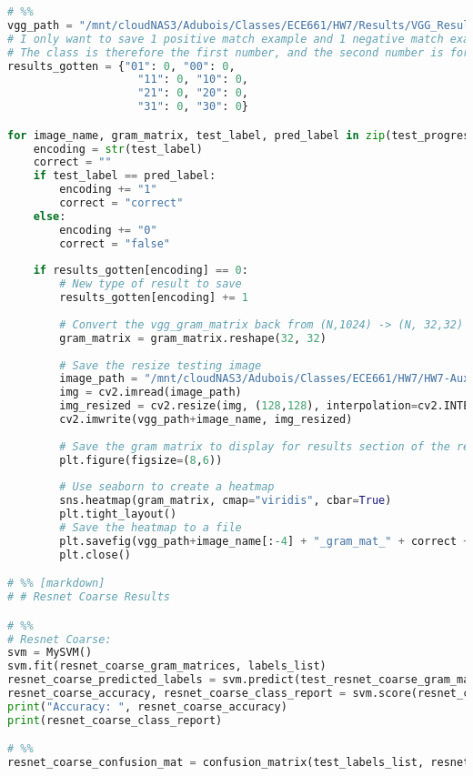 \documentclass{article}
\begin{document}
\begin{lstlisting}[language=Python]
# %%
vgg_path = "/mnt/cloudNAS3/Adubois/Classes/ECE661/HW7/Results/VGG_Results/"
# I only want to save 1 positive match example and 1 negative match example for each class
# The class is therefore the first number, and the second number is for matching labels or not
results_gotten = {"01": 0, "00": 0,
                    "11": 0, "10": 0,
                    "21": 0, "20": 0,
                    "31": 0, "30": 0}

for image_name, gram_matrix, test_label, pred_label in zip(test_progress_bar, test_vgg_gram_matrices, test_labels_list, vgg_predicted_labels):
    encoding = str(test_label)
    correct = ""
    if test_label == pred_label:
        encoding += "1"
        correct = "correct"
    else:
        encoding += "0"
        correct = "false"
    
    if results_gotten[encoding] == 0:
        # New type of result to save
        results_gotten[encoding] += 1
        
        # Convert the vgg_gram_matrix back from (N,1024) -> (N, 32,32) for display
        gram_matrix = gram_matrix.reshape(32, 32)
        
        # Save the resize testing image
        image_path = "/mnt/cloudNAS3/Adubois/Classes/ECE661/HW7/HW7-Auxilliary/data/testing/" + image_name
        img = cv2.imread(image_path)
        img_resized = cv2.resize(img, (128,128), interpolation=cv2.INTER_AREA)
        cv2.imwrite(vgg_path+image_name, img_resized)
        
        # Save the gram matrix to display for results section of the report
        plt.figure(figsize=(8,6))
        
        # Use seaborn to create a heatmap
        sns.heatmap(gram_matrix, cmap="viridis", cbar=True)
        plt.tight_layout()
        # Save the heatmap to a file
        plt.savefig(vgg_path+image_name[:-4] + "_gram_mat_" + correct + ".png", format='png', dpi=300, bbox_inches="tight")
        plt.close()

# %% [markdown]
# # Resnet Coarse Results

# %%
# Resnet Coarse:
svm = MySVM()
svm.fit(resnet_coarse_gram_matrices, labels_list)
resnet_coarse_predicted_labels = svm.predict(test_resnet_coarse_gram_matrices)
resnet_coarse_accuracy, resnet_coarse_class_report = svm.score(resnet_coarse_predicted_labels, test_labels_list)
print("Accuracy: ", resnet_coarse_accuracy)
print(resnet_coarse_class_report)

# %%
resnet_coarse_confusion_mat = confusion_matrix(test_labels_list, resnet_coarse_predicted_labels)


\end{lstlisting}
\end{document}
